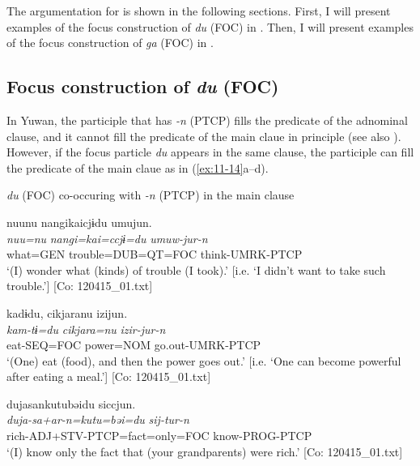 The argumentation for  is shown in the following sections. First, I will present examples of the focus construction of \textit{du} (FOC) in . Then, I will present examples of the focus construction of \textit{ga} (FOC) in .

\subsection{Focus construction of \textit{du} (FOC)}\label{sec:11.3.1}

In Yuwan, the participle that has \textit{{}-n} (PTCP) fills the predicate of the adnominal clause, and it cannot fill the predicate of the main claue in principle (see also ). However, if the focus particle \textit{du} appears in the same clause, the participle can fill the predicate of the main claue as in (\ref{ex:11-14}a--d).

\ea\label{ex:11-15}  \textit{du} (FOC) co-occuring with \textit{{}-n} (PTCP) in the main clause

  \ea\relax[= (6-108 a)]

    
      \glll    nuunu  nangikaicjɨdu  umujun.\\
      \textit{nuu=nu}  \textit{nangi=kai=ccjɨ=du}  \textit{umuw-jur-n}\\
      what=GEN  trouble=DUB=QT=FOC  think-UMRK-PTCP\\
\glt       ‘(I) wonder what (kinds) of trouble (I took).’ [i.e. ‘I didn’t want to take such trouble.’] [Co: 120415\_01.txt]

  \ex  
      \glll    kadɨdu,  cikjaranu  izijun.\\
      \textit{kam-tɨ=du}  \textit{cikjara=nu}  \textit{izir-jur-n}\\
      eat-SEQ=FOC  power=NOM  go.out-UMRK-PTCP\\
\glt       ‘(One) eat (food), and then the power goes out.’ [i.e. ‘One can become powerful after eating a meal.’] [Co: 120415\_01.txt]

  \ex  
      \glll    dujasankutubəidu  siccjun.\\
      \textit{duja-sa+ar-n=kutu=bəi=du}  \textit{sij-tur-n}\\
      rich-ADJ+STV-PTCP=fact=only=FOC  know-PROG-PTCP\\
    \glt       ‘(I) know only the fact that (your grandparents) were rich.’ [Co: 120415\_01.txt]

  \ex{}

